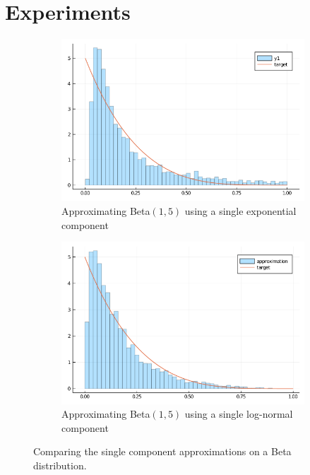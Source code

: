 \section{Experiments} \label{sec:experiments}

\begin{figure}[H]
\centering
\begin{subfigure}{0.45\textwidth}
\includegraphics[width=1\linewidth]{../../plot/exp_single.png}
\caption{Approximating Beta$(1,5)$ using a single exponential component}
\end{subfigure}
\begin{subfigure}{0.45\textwidth}
\includegraphics[width=1\linewidth]{../../plot/gauss_single.png}
\caption{Approximating Beta$(1,5)$ using a single log-normal component}
\end{subfigure}
\caption{Comparing the single component approximations on a Beta distribution.}
\end{figure}

